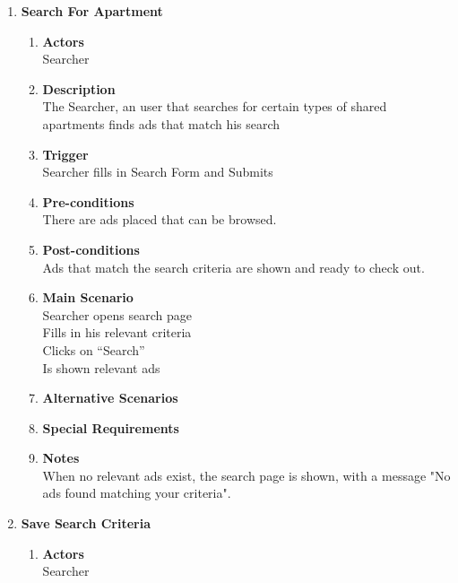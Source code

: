 \documentclass{scrreprt}
\begin{document}
\begin{enumerate}
	\item \textbf{Search For Apartment}
	\begin{enumerate}
		\item \textbf{Actors}  \\
			Searcher\\

		\item \textbf{Description} \\
			The Searcher, an user that searches for certain types of shared apartments finds ads that match his search\\
			
		\item \textbf{Trigger} \\
			Searcher fills in Search Form and Submits\\

		\item \textbf{Pre-conditions} \\
			There are ads placed that can be browsed.\\

		\item \textbf{Post-conditions} \\
			Ads that match the search criteria are shown and ready to check out.\\

		\item \textbf{Main Scenario} \\
			Searcher opens search page\\
			Fills in his relevant criteria\\
			Clicks on “Search”\\
			Is shown relevant ads\\

		\item \textbf{Alternative Scenarios} \\

		\item \textbf{Special Requirements} \\

		\item \textbf{Notes} \\
			When no relevant ads exist, the search page is shown, with a message "No ads found matching your criteria".\\
	\end{enumerate}


	\item \textbf{Save Search Criteria}
	\begin{enumerate}
		\item \textbf{Actors}  \\
			Searcher\\


\end{enumerate}
\end{enumerate}
\end{document}
